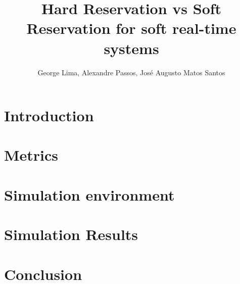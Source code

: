 \documentclass{article}
\author{George Lima, Alexandre Passos, José Augusto Matos Santos}
\title{Hard Reservation vs Soft Reservation for soft real-time systems}
\newcommand{\comentario}[1]{}
\begin{document}
\maketitle


\section{Introduction}
\label{sec:introduction}


\comentario{ Grande quantidade de trabalhos relativos ao uso de
  reservação de banda. Falta de estudos comparativos sobre
  hard/soft. Conexão com aplicações que poderiam se beneficiar do
  estudo.

  ** Adaptatividade
   
  falar que imaginam que hard é mais adaptativo que soft; mentira,
  dizer que a simulação desprova isso 

* Trabalhos relacionados
  
  Procurar
}

\section{Metrics}
\label{sec:metrics}

\comentario{   
* Métricas comparativas
  
  Descrição e conexão com aplicações.

  
** Tempo de resposta
   
   
** Intervalo entre deadlines
}

\section{Simulation environment}
\label{sec:simul-envir}

\comentario{
* Simulação
  
  Descrição do ambiente, modelo de tarefas, dados de entrada, etc.
}

\section{Simulation Results}
\label{sec:simulation-results}

\section{Conclusion}
\label{sec:conclusion}





\end{document}
